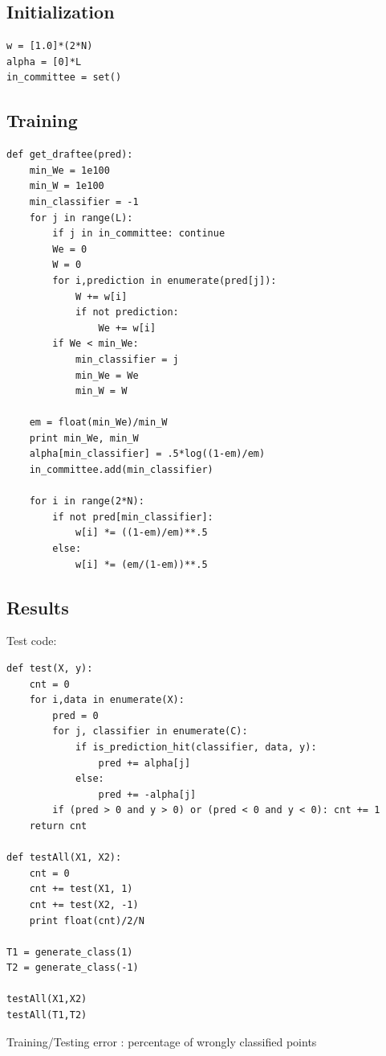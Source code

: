 \documentclass[]{article}  %
\begin{document}
\subsection{Initialization}
\begin{verbatim}
w = [1.0]*(2*N)
alpha = [0]*L
in_committee = set()
\end{verbatim}

\subsection{Training}
\begin{verbatim}
def get_draftee(pred):
    min_We = 1e100
    min_W = 1e100
    min_classifier = -1
    for j in range(L):
        if j in in_committee: continue
        We = 0
        W = 0
        for i,prediction in enumerate(pred[j]):
            W += w[i]
            if not prediction:
                We += w[i]
        if We < min_We:
            min_classifier = j
            min_We = We
            min_W = W
            
    em = float(min_We)/min_W
    print min_We, min_W
    alpha[min_classifier] = .5*log((1-em)/em)
    in_committee.add(min_classifier)
    
    for i in range(2*N):
        if not pred[min_classifier]:
            w[i] *= ((1-em)/em)**.5
        else:
            w[i] *= (em/(1-em))**.5 
\end{verbatim}

\subsection{Results}

Test code:

\begin{verbatim}
def test(X, y):
    cnt = 0
    for i,data in enumerate(X):
        pred = 0
        for j, classifier in enumerate(C):
            if is_prediction_hit(classifier, data, y):
                pred += alpha[j]
            else:
                pred += -alpha[j]
        if (pred > 0 and y > 0) or (pred < 0 and y < 0): cnt += 1
    return cnt
        
def testAll(X1, X2):
    cnt = 0
    cnt += test(X1, 1)
    cnt += test(X2, -1)
    print float(cnt)/2/N
    
T1 = generate_class(1)
T2 = generate_class(-1)

testAll(X1,X2)
testAll(T1,T2)
\end{verbatim}
Training/Testing error : percentage of wrongly classified points
\end{document}
